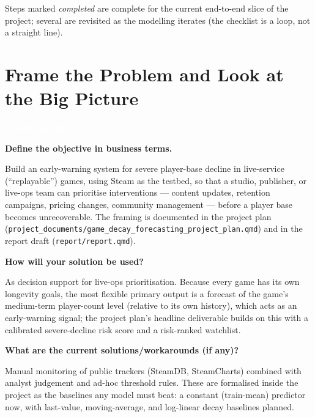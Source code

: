 \documentclass[11pt,a4paper]{article}
\newcommand{\StatusBadge}[2]{\colorbox{#1}{\textcolor{white}{\sffamily\bfseries\footnotesize\;#2\;}}}
\newcommand{\SectionStatus}[2]{\noindent\StatusBadge{#1}{#2}\par\medskip}
\newcommand{\chk}[1]{\item \textbf{#1}\par\nopagebreak\vspace{0.15em}}
\begin{document}
\noindent
Steps marked \emph{completed} are complete for the current end-to-end slice
of the project; several are revisited as the modelling iterates (the
checklist is a loop, not a straight line).

\section{Frame the Problem and Look at the Big Picture}
\SectionStatus{stdone}{COMPLETED}

\begin{checklist}

\chk{Define the objective in business terms.}
Build an early-warning system for severe player-base decline in
live-service (``replayable'') games, using Steam as the testbed, so that a
studio, publisher, or live-ops team can prioritise interventions --- content
updates, retention campaigns, pricing changes, community management ---
before a player base becomes unrecoverable. The framing is documented in the
project plan
(\texttt{project\_documents/game\_decay\_forecasting\_project\_plan.qmd})
and in the report draft (\texttt{report/report.qmd}).

\chk{How will your solution be used?}
As decision support for live-ops prioritisation. Because every game has its
own longevity goals, the most flexible primary output is a forecast of the
game's medium-term player-count level (relative to its own history), which
acts as an early-warning signal; the project plan's headline deliverable
builds on this with a calibrated severe-decline risk score and a risk-ranked
watchlist.

\chk{What are the current solutions/workarounds (if any)?}
Manual monitoring of public trackers (SteamDB, SteamCharts) combined with
analyst judgement and ad-hoc threshold rules. These are formalised inside
the project as the baselines any model must beat: a constant
(train-mean) predictor now, with last-value, moving-average, and log-linear
decay baselines planned.


\end{checklist}
\end{document}
